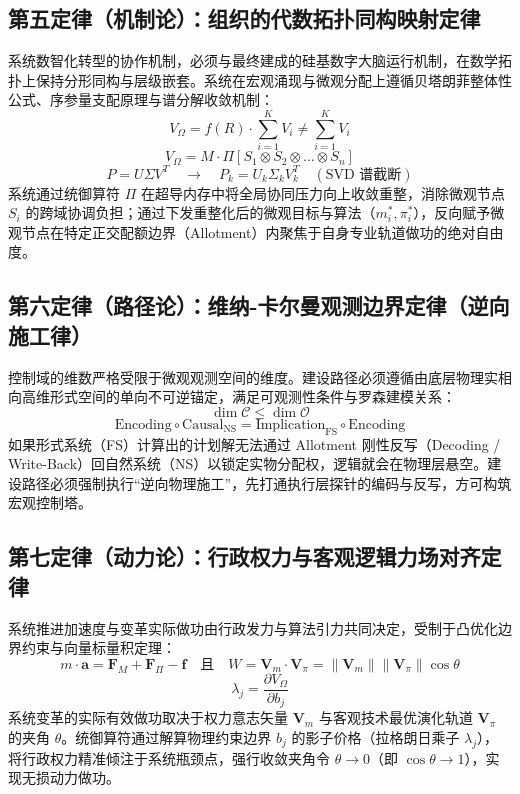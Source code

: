\documentclass[11pt,a4paper]{article}
\begin{document}
\subsection*{第五定律（机制论）：组织的代数拓扑同构映射定律}
系统数智化转型的协作机制，必须与最终建成的硅基数字大脑运行机制，在数学拓扑上保持分形同构与层级嵌套。系统在宏观涌现与微观分配上遵循贝塔朗菲整体性公式、序参量支配原理与谱分解收敛机制：
\begin{equation}
    V_{\Omega} = f(R) \cdot \sum_{i=1}^{K} V_i \neq \sum_{i=1}^{K} V_i
\end{equation}
\begin{equation}
    V_{\Omega} = M \cdot \Pi \left[ S_1 \otimes S_2 \otimes \dots \otimes S_n \right]
\end{equation}
\begin{equation}
    P = U \Sigma V^T \quad \to \quad P_k = U_k \Sigma_k V_k^T \quad (\text{SVD 谱截断})
\end{equation}
系统通过统御算符 $\Pi$ 在超导内存中将全局协同压力向上收敛重整，消除微观节点 $S_i$ 的跨域协调负担；通过下发重整化后的微观目标与算法（$m_i^*, \pi_i^*$），反向赋予微观节点在特定正交配额边界（Allotment）内聚焦于自身专业轨道做功的绝对自由度。

\subsection*{第六定律（路径论）：维纳-卡尔曼观测边界定律（逆向施工律）}
控制域的维数严格受限于微观观测空间的维度。建设路径必须遵循由底层物理实相向高维形式空间的单向不可逆锚定，满足可观测性条件与罗森建模关系：
\begin{equation}
    \dim \mathcal{C} \le \dim \mathcal{O}
\end{equation}
\begin{equation}
    \text{Encoding} \circ \text{Causal}_{\text{NS}} = \text{Implication}_{\text{FS}} \circ \text{Encoding}
\end{equation}
如果形式系统（FS）计算出的计划解无法通过 Allotment 刚性反写（Decoding / Write-Back）回自然系统（NS）以锁定实物分配权，逻辑就会在物理层悬空。建设路径必须强制执行“逆向物理施工”，先打通执行层探针的编码与反写，方可构筑宏观控制塔。

\subsection*{第七定律（动力论）：行政权力与客观逻辑力场对齐定律}
系统推进加速度与变革实际做功由行政发力与算法引力共同决定，受制于凸优化边界约束与向量标量积定理：
\begin{equation}
    m \cdot \mathbf{a} = \mathbf{F}_M + \mathbf{F}_{\Pi} - \mathbf{f} \quad \text{且} \quad W = \mathbf{V}_m \cdot \mathbf{V}_{\pi} = \|\mathbf{V}_m\| \|\mathbf{V}_{\pi}\| \cos \theta
\end{equation}
\begin{equation}
    \lambda_j = \frac{\partial V_{\Omega}}{\partial b_j}
\end{equation}
系统变革的实际有效做功取决于权力意志矢量 $\mathbf{V}_m$ 与客观技术最优演化轨道 $\mathbf{V}_{\pi}$ 的夹角 $\theta$。统御算符通过解算物理约束边界 $b_j$ 的影子价格（拉格朗日乘子 $\lambda_j$），将行政权力精准倾注于系统瓶颈点，强行收敛夹角令 $\theta \to 0$（即 $\cos\theta \to 1$），实现无损动力做功。
\end{document}
